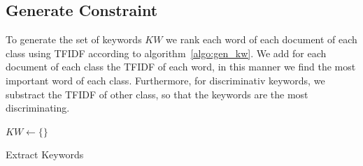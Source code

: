 \subsection{Generate Constraint}
To generate the set of keywords $KW$ we rank each word of each 
document of each class using TFIDF according to algorithm~\ref{algo:gen_kw}.
We add for each document of each class the TFIDF of each word, in this manner
we find the most important word of each class. Furthermore, for discriminativ keywords,
we substract  the TFIDF of other class, so that the keywords are the most discriminating.
\begin{algorithm}
  $KW \gets \{\}$\\
  \caption{\label{algo:gen_kw}Extract Keywords}
\end{algorithm}

